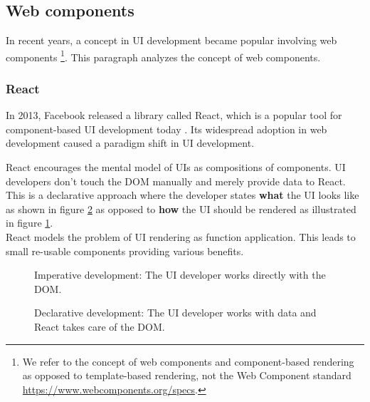 \subsection{Web components}\label{webcomponents}
In recent years, a concept in UI development became popular involving web components \footnote{We refer to the concept of web components and component-based rendering as opposed to template-based rendering, not the Web Component standard \url{https://www.webcomponents.org/specs}.}. This paragraph analyzes the concept of web components.

\subsubsection{React}\label{sec:react}
In 2013, Facebook released a library called React, which is a popular tool for component-based UI development today \citep{reactmarketshare}. Its widespread adoption in web development caused a paradigm shift in UI development.

React encourages the mental model of UIs as compositions of components. UI developers don't touch the DOM manually and merely provide data to React. This is a declarative approach where the developer states \textbf{what} the UI looks like as shown in figure \ref{fig:declarative} as opposed to \textbf{how} the UI should be rendered as illustrated in figure \ref{fig:imperative}. \\
React models the problem of UI rendering as function application. This leads to small re-usable components providing various benefits.

\begin{figure}[!htb]
  \caption{Imperative development: The UI developer works directly with the DOM.}
  \label{fig:imperative}
\end{figure}

\begin{figure}[!htb]
  \caption{Declarative development: The UI developer works with data and React takes care of the DOM.}
  \label{fig:declarative}
\end{figure}

